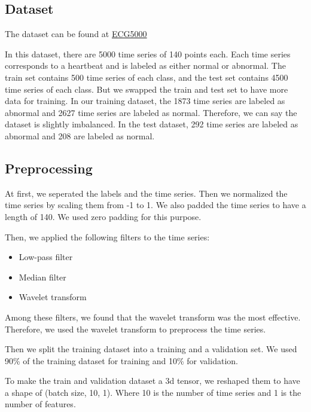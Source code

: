 \subsection{Dataset}

The dataset can be found at \href{https://www.timeseriesclassification.com/description.php?Dataset=ECG5000}{ECG5000}

In this dataset, there are 5000 time series of 140 points each. Each time series corresponds to a heartbeat and is labeled as either normal or abnormal. The train set contains 500 time series of each class, and the test set contains 4500 time series of each class. But we swapped the train and test set to have more data for training. In our training dataset, the 1873 time series are labeled as abnormal and 2627 time series are labeled as normal. Therefore, we can say the dataset is slightly imbalanced. In the test dataset, 292 time series are labeled as abnormal and 208 are labeled as normal.

\subsection{Preprocessing}

At first, we seperated the labels and the time series. Then we normalized the time series by scaling them from -1 to 1. We also padded the time series to have a length of 140. We used zero padding for this purpose.

Then, we applied the following filters to the time series:
\begin{itemize}
    \item Low-pass filter
    \item Median filter
    \item Wavelet transform
\end{itemize}

Among these filters, we found that the wavelet transform was the most effective. Therefore, we used the wavelet transform to preprocess the time series.

Then we split the training dataset into a training and a validation set. We used 90\% of the training dataset for training and 10\% for validation.

To make the train and validation dataset a 3d tensor, we reshaped them to have a shape of (batch size, 10, 1). Where 10 is the number of time series and 1 is the number of features.


